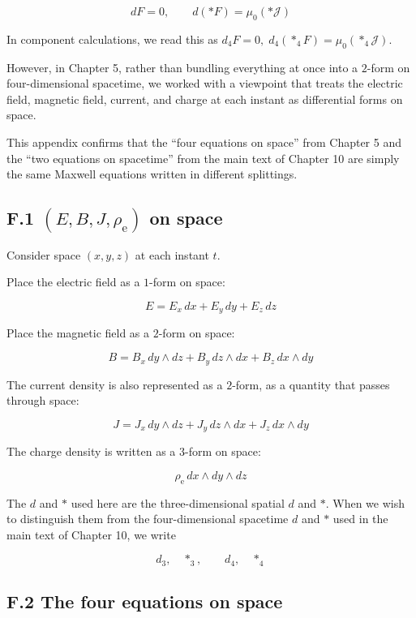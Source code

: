 \documentclass[a4paper,12pt,openany]{book}
\begin{document}
\[
dF=0,
\qquad
d(\ast F)=\mu_0(\ast\mathcal{J})
\]

In component calculations, we read this as
\(d_4F=0,\;d_4(\ast_4F)=\mu_0(\ast_4\mathcal J)\).

However, in Chapter 5, rather than bundling everything at once into a
\(2\)-form on four-dimensional spacetime, we worked with a viewpoint
that treats the electric field, magnetic field, current, and charge at
each instant as differential forms on space.

This appendix confirms that the ``four equations on space'' from Chapter
5 and the ``two equations on spacetime'' from the main text of Chapter
10 are simply the same Maxwell equations written in different
splittings.

\hypertarget{f.1-ebjrho_mathrm-e-on-space}{%
\subsection*{\texorpdfstring{F.1 \((E,B,J,\rho_{\mathrm e})\) on
space}{F.1 (E,B,J,\textbackslash rho\_\{\textbackslash mathrm e\}) on space}}\label{f.1-ebjrho_mathrm-e-on-space}}

Consider space \((x,y,z)\) at each instant \(t\).

Place the electric field as a \(1\)-form on space:

\[
E = E_x\,dx + E_y\,dy + E_z\,dz
\]

Place the magnetic field as a \(2\)-form on space:

\[
B = B_x\,dy\wedge dz + B_y\,dz\wedge dx + B_z\,dx\wedge dy
\]

The current density is also represented as a \(2\)-form, as a quantity
that passes through space:

\[
J = J_x\,dy\wedge dz + J_y\,dz\wedge dx + J_z\,dx\wedge dy
\]

The charge density is written as a \(3\)-form on space:

\[
\rho_{\mathrm e}\,dx\wedge dy\wedge dz
\]

The \(d\) and \(\ast\) used here are the three-dimensional spatial \(d\)
and \(\ast\). When we wish to distinguish them from the four-dimensional
spacetime \(d\) and \(\ast\) used in the main text of Chapter 10, we
write

\[
d_3,\quad \ast_3,
\qquad
d_4,\quad \ast_4
\]

\hypertarget{f.2-the-four-equations-on-space}{%
\subsection*{F.2 The four equations on
space}\label{f.2-the-four-equations-on-space}}
\end{document}

